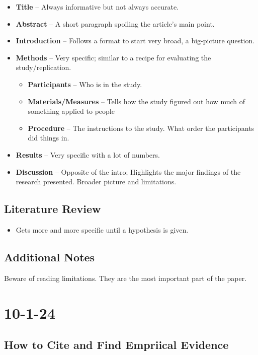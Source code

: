 \documentclass{report}
\begin{document}
\begin{itemize}
    \item \textbf{Title} -- Always informative but not always accurate.
    \item \textbf{Abstract} -- A short paragraph spoiling the article's main point.
    \item \textbf{Introduction} -- Follows a format to start very broad, a big-picture question.
    \item \textbf{Methods} -- Very specific; similar to a recipe for evaluating the study/replication.
    \begin{itemize}
        \item \textbf{Participants} -- Who is in the study.
        \item \textbf{Materials/Measures} -- Tells how the study figured out how much of something applied to people
        \item \textbf{Procedure} -- The instructions to the study. What order the participants did things in.
    \end{itemize}
    \item \textbf{Results} -- Very specific with a lot of numbers. 
    \item \textbf{Discussion} -- Opposite of the intro; Highlights the major findings of the research presented. Broader picture and limitations.
\end{itemize}

\subsection{Literature Review}
\begin{itemize}
    \item Gets more and more specific until a hypothesis is given. 
\end{itemize}

\subsection{Additional Notes}
Beware of reading limitations. They are the most important part of the paper.

\section{10-1-24}

\subsection{How to Cite and Find Empriical Evidence}
\end{document}

